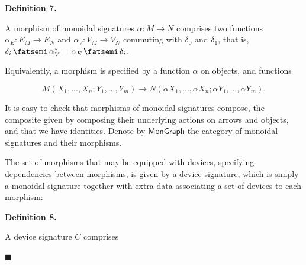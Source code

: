  
 
\par\medskip\noindent\textbf{Definition 7.}\par
 
 
A morphism of monoidal signatures $\alpha:M\to N$ comprises two functions $\alpha_{E}:E_{M}\to E_{N}$ and $\alpha_{V}:V_{M}\to V_{N}$ commuting with $\delta_{0}$ and $\delta_{1}$, that is, $\delta_{i}\mathop{\fatsemi}\alpha_{V}^{*}=\alpha_{E}\mathop{\fatsemi}\delta_{i}$.\par
 
 
 
Equivalently, a morphism is specified by a function $\alpha$ on objects, and functions\par
    \[M(X_{1},...,X_{n};Y_{1},...,Y_{m})\to N(\alpha X_{1},...,\alpha X_{n};\alpha Y_{1},...,\alpha Y_{m}).\]    
 
 
It is easy to check that morphisms of monoidal signatures compose, the composite given by composing their underlying actions on arrows and objects, and that we have identities. Denote by $\mathsf{MonGraph}$ the category of monoidal signatures and their morphisms.\par
 
 
 
 
The set of morphisms that may be equipped with devices, specifying dependencies between morphisms, is given by a device signature, which is simply a monoidal signature together with extra data associating a set of devices to each morphism:\par
 
 
 
\par\medskip\noindent\textbf{Definition 8.}\par
 
 
A device signature $C$ comprises\par
  
\par\noindent  $\blacksquare$ 
 
